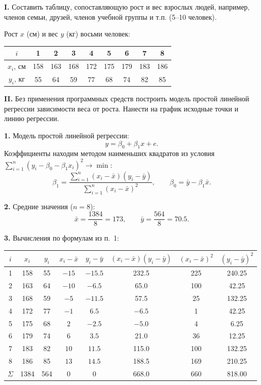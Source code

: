 \documentclass{article}
\begin{document}
\begin{framed}
    \textbf{I.} Составить таблицу, сопоставляющую рост и вес взрослых людей, например,
    членов семьи, друзей, членов учебной группы и т.п. (5--10 человек).
\end{framed}
    Рост $x$ (см) и вес $y$ (кг) восьми человек:
    \begin{center}
    \begin{tabular}{|c|c|c|c|c|c|c|c|c|}
        \hline
        $i$ & 1 & 2 & 3 & 4 & 5 & 6 & 7 & 8 \\ \hline
        $x_i$, см & 158 & 163 & 168 & 172 & 175 & 179 & 183 & 186 \\ \hline
        $y_i$, кг & 55 & 64 & 59 & 77 & 68 & 74 & 82 & 85 \\ \hline
    \end{tabular}
    \end{center}

\begin{framed}
    \textbf{II.} Без применения программных средств построить модель простой линейной
    регрессии зависимости веса от роста. Нанести на график исходные точки и линию регрессии.
\end{framed}
    \textbf{1.} Модель простой линейной регрессии: \[y=\beta_0+\beta_1x+e.\] Коэффициенты находим методом наименьших квадратов из условия $\sum_{i=1}^{n}(y_i-\beta_0-\beta_1x_i)^2\to\min$:
    \[\beta_1=\frac{\sum_{i=1}^{n}(x_i-\bar x)(y_i-\bar y)}{\sum_{i=1}^{n}(x_i-\bar x)^2},\qquad \beta_0=\bar y-\beta_1\bar x.\]

    \textbf{2.} Средние значения ($n=8$):
    \[\bar x=\frac{1384}{8}=173,\qquad \bar y=\frac{564}{8}=70.5.\]

    \textbf{3.} Вычисления по формулам из п.~1:
    \begin{center}
    \begin{tabular}{|c|c|c|c|c|c|c|c|}
        \hline
        $i$ & $x_i$ & $y_i$ & $x_i-\bar x$ & $y_i-\bar y$ & $(x_i-\bar x)(y_i-\bar y)$ & $(x_i-\bar x)^2$ & $(y_i-\bar y)^2$ \\ \hline
        1 & 158 & 55 & $-15$ & $-15.5$ & 232.5 & 225 & 240.25 \\
        2 & 163 & 64 & $-10$ & $-6.5$ & 65.0 & 100 & 42.25 \\
        3 & 168 & 59 & $-5$ & $-11.5$ & 57.5 & 25 & 132.25 \\
        4 & 172 & 77 & $-1$ & $6.5$ & $-6.5$ & 1 & 42.25 \\
        5 & 175 & 68 & $2$ & $-2.5$ & $-5.0$ & 4 & 6.25 \\
        6 & 179 & 74 & $6$ & $3.5$ & 21.0 & 36 & 12.25 \\
        7 & 183 & 82 & $10$ & $11.5$ & 115.0 & 100 & 132.25 \\
        8 & 186 & 85 & $13$ & $14.5$ & 188.5 & 169 & 210.25 \\ \hline
        $\Sigma$ & 1384 & 564 & 0 & 0 & 668.0 & 660 & 818.00 \\ \hline
    \end{tabular}
    \end{center}
\end{document}
